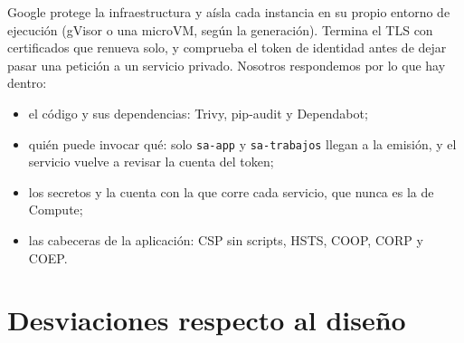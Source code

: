 \documentclass[11pt,letterpaper]{article}
\newcommand{\cod}[1]{\texttt{\small #1}}
\begin{document}
Google protege la infraestructura y aísla cada instancia en su propio entorno de ejecución (gVisor o una microVM, según la generación). Termina el TLS con certificados que renueva solo, y comprueba el token de identidad antes de dejar pasar una petición a un servicio privado. Nosotros respondemos por lo que hay dentro:
\begin{itemize}
  \item el código y sus dependencias: Trivy, pip-audit y Dependabot;
  \item quién puede invocar qué: solo \cod{sa-app} y \cod{sa-trabajos} llegan a la emisión, y el
    servicio vuelve a revisar la cuenta del token;
  \item los secretos y la cuenta con la que corre cada servicio, que nunca es la de Compute;
  \item las cabeceras de la aplicación: CSP sin scripts, HSTS, COOP, CORP y COEP.
\end{itemize}

\section{Desviaciones respecto al diseño}
\end{document}

